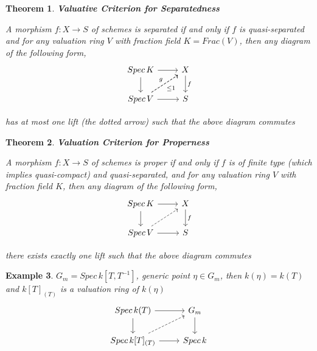 \documentclass{article}
\newtheorem{theorem}{Theorem}[section]
\newtheorem{example}[theorem]{Example}
\begin{document}
\begin{theorem}
\textbf{Valuative Criterion for Separatedness}

A morphism $f : X \to S$ of schemes is separated if and only if $f$ is quasi-separated and for any valuation ring $V$ with fraction field $K=Frac(V)$, then any
diagram of the following form,
\[\begin{tikzcd}
	{Spec\,K} & X \\
	{Spec\,V} & S
	\arrow[from=2-1, to=2-2]
	\arrow["f", from=1-2, to=2-2]
	\arrow[from=1-1, to=2-1]
	\arrow[from=1-1, to=1-2]
	\arrow["g", dashed, from=2-1, to=1-2]
	\arrow["{\leq 1}"', dashed, from=2-1, to=1-2]
\end{tikzcd}\]

has at most one lift (the dotted arrow) such that the above diagram commutes
\end{theorem}

\begin{theorem}
\textbf{Valuation Criterion for Properness}

A morphism $f : X \to S$ of schemes is proper if
and only if $f$ is of finite type (which implies quasi-compact) and quasi-separated, and for any valuation
ring $V$ with fraction field $K$, then any diagram of the following form,
\[\begin{tikzcd}
	{Spec\,K} & X \\
	{Spec\,V} & S
	\arrow[from=2-1, to=2-2]
	\arrow["f", from=1-2, to=2-2]
	\arrow[from=1-1, to=2-1]
	\arrow[from=1-1, to=1-2]
	\arrow[dashed, from=2-1, to=1-2]
\end{tikzcd}\]

there exists exactly one lift such that the above diagram commutes
\end{theorem}

\begin{example}
$G_m=Spec\,k[T,T^{-1}]$, generic point $\eta\in G_m$, then $k(\eta)=k(T)$ and $k[T]_{(T)}$ is a valuation ring of $k(\eta)$
\[\begin{tikzcd}
	{Spec\,k(T)} & G_m \\
	{Spec\,k[T]_{(T)}} & Spec\,k
	\arrow[from=2-1, to=2-2]
	\arrow[from=1-2, to=2-2]
	\arrow[from=1-1, to=2-1]
	\arrow[from=1-1, to=1-2]
	\arrow[dashed, from=2-1, to=1-2]
\end{tikzcd}\]
\end{example}
\end{document}
